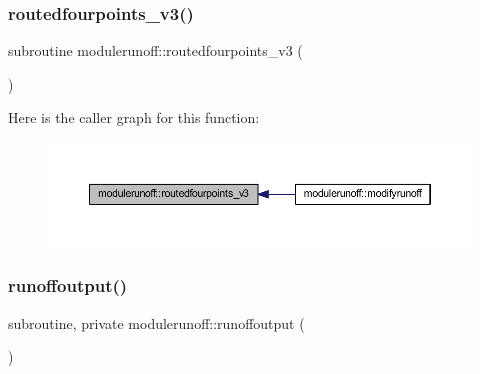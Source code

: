\mbox{\label{namespacemodulerunoff_a7ca1b43ca23fdb3f25a304ec7ea33a92}} 
\subsubsection{\texorpdfstring{routedfourpoints\+\_\+v3()}{routedfourpoints\_v3()}}
{\footnotesize\ttfamily subroutine modulerunoff\+::routedfourpoints\+\_\+v3 (\begin{DoxyParamCaption}{ }\end{DoxyParamCaption})\hspace{0.3cm}{\ttfamily [private]}}

Here is the caller graph for this function\+:\nopagebreak
\begin{figure}[H]
\begin{center}
\leavevmode
\includegraphics[width=350pt]{namespacemodulerunoff_a7ca1b43ca23fdb3f25a304ec7ea33a92_icgraph}
\end{center}
\end{figure}
\mbox{\label{namespacemodulerunoff_af0c6bd2433c33b62204214405fa2bd23}} 
\subsubsection{\texorpdfstring{runoffoutput()}{runoffoutput()}}
{\footnotesize\ttfamily subroutine, private modulerunoff\+::runoffoutput (\begin{DoxyParamCaption}{ }\end{DoxyParamCaption})\hspace{0.3cm}{\ttfamily [private]}}

